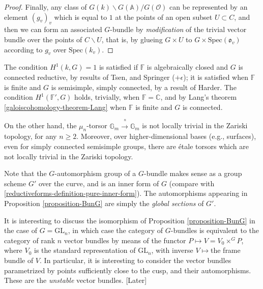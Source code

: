 \begin{proof}
Finally, any class of $G(k)\backslash G(\mathbb A)/G(\mathcal O)$ can be represented by an element $(g_v)_v$ which is equal to $1$ at the points of an open subset $U\subset C$, and then we can form an associated $G$-bundle by \emph{modification} of the trivial vector bundle over the points of $C\smallsetminus U$, that is, by glueing $G\times U$ to $G\times \text{Spec}(\mathfrak o_v)$ according to $g_v$ over $\text{Spec}(k_v)$. 
\end{proof}



\begin{remark}
\label{remark-vanishing-cohomology}
The condition $H^1(k,G)=1$ is satisfied if $\mathbb F$ is algebraically closed and $G$ is connected reductive, by results of Tsen, and Springer ($+\epsilon$); it is satisfied when $\mathbb F$ is finite and $G$ is semisimple, simply connected, by a result of Harder. The condition $H^1(\mathbb F',G)$ holds, trivially, when $\mathbb F = \mathbb C$, and by Lang's theorem \ref{galoiscohomology-theorem-Lang} when $\mathbb F$ is finite and $G$ is connected.

On the other hand, the $\mu_n$-torsor $\mathbb G_m\xrightarrow{~^n}\mathbb G_m$ is not locally trivial in the Zariski topology, for  any $n\ge 2$. Moreover, over higher-dimensional bases (e.g., surfaces), even for simply connected semisimple groups, there are \'etale torsors which are not locally trivial in the Zariski topology.
\end{remark}

\begin{remark}
 \label{remark-automorphism-group}
Note that the $G$-automorphism group of a $G$-bundle makes sense as a group scheme $G'$ over the curve, and is an inner form of $G$ (compare with \ref{reductiveforms-definition-pure-inner-form}). The automorphisms appearing in Proposition \ref{proposition-BunG} are simply the \emph{global sections} of $G'$.
\end{remark}

It is interesting to discuss the isomorphism of Proposition \ref{proposition-BunG} in the case of $G= \text{GL}_n$, in which case the category of $G$-bundles is equivalent to the category of rank $n$ vector bundles by means of the functor $P\mapsto V=V_0\times^G P$, where $V_0$ is the standard representation of $\text{GL}_n$, with inverse $V\mapsto $the frame bundle of $V$. In particular, it is interesting to consider the vector bundles parametrized by points sufficiently close to the cusp, and their automorphisms. These are the \emph{unstable} vector bundles. [Later]

